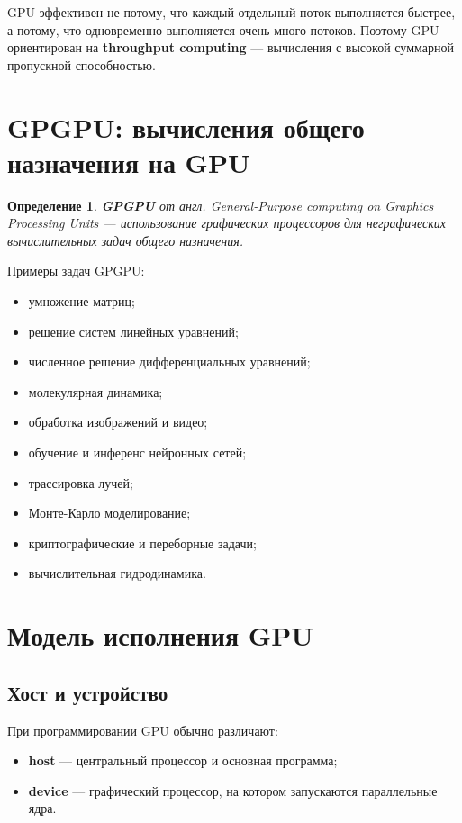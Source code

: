 \documentclass[12pt,a4paper]{article}
\newtheorem{definition}{Определение}
\begin{document}
GPU эффективен не потому, что каждый отдельный поток выполняется быстрее, а потому, что одновременно выполняется очень много потоков. Поэтому GPU ориентирован на \textbf{throughput computing} --- вычисления с высокой суммарной пропускной способностью.

\section{GPGPU: вычисления общего назначения на GPU}

\begin{definition}
\textbf{GPGPU} от англ. \emph{General-Purpose computing on Graphics Processing Units} --- использование графических процессоров для неграфических вычислительных задач общего назначения.
\end{definition}

Примеры задач GPGPU:

\begin{itemize}
    \item умножение матриц;
    \item решение систем линейных уравнений;
    \item численное решение дифференциальных уравнений;
    \item молекулярная динамика;
    \item обработка изображений и видео;
    \item обучение и инференс нейронных сетей;
    \item трассировка лучей;
    \item Монте-Карло моделирование;
    \item криптографические и переборные задачи;
    \item вычислительная гидродинамика.
\end{itemize}

\section{Модель исполнения GPU}

\subsection{Хост и устройство}

При программировании GPU обычно различают:

\begin{itemize}
    \item \textbf{host} --- центральный процессор и основная программа;
    \item \textbf{device} --- графический процессор, на котором запускаются параллельные ядра.
\end{itemize}
\end{document}
